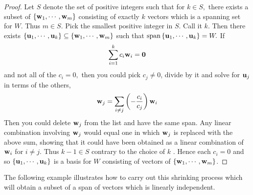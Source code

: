 \begin{proof}
Let $S$ denote the set of positive integers such that for $
k\in S,$ there exists a subset of $\left\{\mbox{\bf w}_{1},\cdots ,\mbox{\bf w}_{m}\right\} $ consisting of exactly $k$ vectors
which is a spanning set for $W$. Thus $m\in S$. Pick the smallest positive
integer in $S$. Call it $k$. Then there exists $\left\{\mbox{\bf u}_{1},\cdots ,
\mbox{\bf u}_{k}\right\} \subseteq \left\{\mbox{\bf w}_{1},\cdots ,\mbox{\bf w}
_{m}\right\} $ such that $\mbox{\rm span}\left\{\mbox{\bf u}_{1},\cdots ,\mbox{\bf u}
_{k}\right\} =W.$ If 
\begin{equation*}
\sum_{i=1}^{k}c_{i}\mbox{\bf w}_{i}=\mbox{\bf 0}
\end{equation*}
and not all of the $c_{i}=0,$ then you could pick $c_{j}\neq 0$, divide by
it and solve for $\mbox{\bf u}_{j}$ in terms of the others, 
\begin{equation*}
\mbox{\bf w}_{j}=\sum_{i\neq j}\left(-\frac{c_{i}}{c_{j}}\right) \mbox{\bf w}_{i}
\end{equation*}
Then you could delete $\mbox{\bf w}_{j}$ from the list and have the same span. Any linear combination involving $\mbox{\bf w}_{j}$ would equal one in which $\mbox{\bf w}_{j}$ is replaced with the
above sum, showing that it could have been obtained as a linear combination
of $\mbox{\bf w}_{i}$ for $i\neq j$. Thus $k-1\in S$ contrary to the choice of $k$
. Hence each $c_{i}=0$ and so $\left\{\mbox{\bf u}_{1},\cdots ,\mbox{\bf u}
_{k}\right\} $ is a basis for $W$ consisting of vectors of $\left\{\mbox{\bf w}
_{1},\cdots ,\mbox{\bf w}_{m}\right\} $.
\end{proof}

The following example illustrates how to carry out this shrinking process which will obtain a subset of a span
of vectors which is linearly independent.


